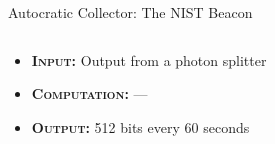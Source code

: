 \begin{frame}{Autocratic Collector: The NIST Beacon}
    \begin{columns}
        \begin{column}{0.7\textwidth}
						\vspace{.5cm}
            \begin{itemize}
                \item \textsc{\textbf{Input:}} Output from a photon splitter
								\item \textsc{\textbf{Computation:}} ---
                \item \textsc{\textbf{Output:}} 512 bits every 60 seconds
								

\end{itemize}
\end{column}
\end{columns}
\end{frame}
